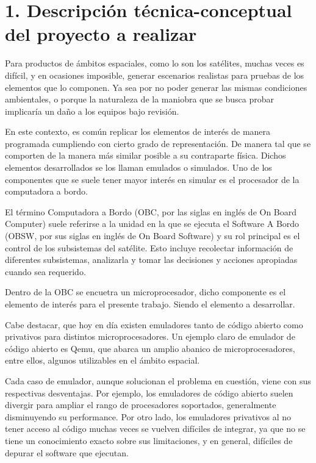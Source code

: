 \section{1. Descripción técnica-conceptual del proyecto a realizar}
\label{sec:descripcion}

Para productos de ámbitos espaciales, como lo son los satélites, muchas veces es difícil, y en ocasiones imposible, generar escenarios realistas para pruebas de los elementos que lo componen. Ya sea por no poder generar las mismas condiciones ambientales, o porque la naturaleza de la maniobra que se busca probar implicaría un daño a los equipos bajo revisión.

En este contexto, es común replicar los elementos de interés de manera programada cumpliendo con cierto grado de representación. De manera tal que se comporten de la manera más similar posible a su contraparte física. Dichos elementos desarrollados se los llaman emulados o simulados. Uno de los componentes que se suele tener mayor interés en simular es el procesador de la computadora a bordo.

El término Computadora a Bordo (OBC, por las siglas en inglés de On Board Computer) suele referirse a la unidad en la que se ejecuta el Software A Bordo (OBSW, por sus siglas en inglés de On Board Software) y su rol principal es el control de los subsistemas del satélite. Esto incluye recolectar información de diferentes subsistemas, analizarla y tomar las decisiones y acciones apropiadas cuando sea requerido.

Dentro de la OBC se encuetra un microprocesador, dicho componente es el elemento de interés para el presente trabajo. Siendo el elemento a desarrollar.

Cabe destacar, que hoy en día existen emuladores tanto de código abierto como privativos para distintos microprocesadores. Un ejemplo claro de emulador de código abierto es Qemu, que abarca un amplio abanico de microprocesadores, entre ellos, algunos utilizables en el ámbito espacial.

Cada caso de emulador, aunque solucionan el problema en cuestión, viene con sus respectivas desventajas. Por ejemplo, los emuladores de código abierto suelen divergir para ampliar el rango de procesadores soportados, generalmente disminuyendo su performance. Por otro lado, los emuladores privativos al no tener acceso al código muchas veces se vuelven difíciles de integrar, ya que no se tiene un conocimiento exacto sobre sus limitaciones, y en general, difíciles de depurar el software que ejecutan.

